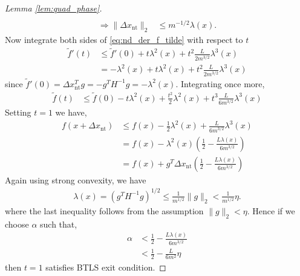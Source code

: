 \documentclass[12pt]{report}
\begin{document}
\begin{proof}[Lemma \ref{lem:quad_phase}]
\begin{align*}
\\ \Rightarrow   \|\Delta x_{\mathrm{nt}} \|_2  & \le m^{-1/2} \lambda(x).
\end{align*}
Now integrate both sides of \eqref{eq:nd_der_f_tilde} with respect to $t$
\begin{align*}
\tilde{f}'(t) & \le \tilde{f}'(0) + t \lambda^2(x) + t^2 \frac{L}{2m^{3/2}} \lambda^3(x)
\\ & = - \lambda^2(x) + t \lambda^2(x) + t^2 \frac{L}{2m^{3/2}} \lambda^3(x)
\end{align*} 
since $\tilde{f}'(0) = \Delta x_{\mathrm{nt}}^T g = -g^TH^{-1}g=- \lambda^2(x) $. Integrating once more,
\begin{align*}
\tilde{f}(t) & \le \tilde{f}(0)- t \lambda^2(x) + \frac{t^2}{2} \lambda^2(x) + t^3 \frac{L}{6 m^{3/2}} \lambda^3(x)
\end{align*} 
Setting $t=1$ we have,
\begin{align*}
f(x+\Delta x_{\mathrm{nt}}) & \le f(x) - \frac{1}{2} \lambda^2(x) + \frac{L}{6 m^{3/2}} \lambda^3(x)
\\ & = f(x) - \lambda^2(x) \left(\frac{1}{2}  - \frac{L\lambda(x)}{6 m^{3/2}} \right )
\\ & = f(x) + g^T \Delta x_{\mathrm{nt}} \left(\frac{1}{2}  - \frac{L\lambda(x)}{6 m^{3/2}} \right )
\end{align*} 
Again using strong convexity, we have
\begin{align*}
\lambda(x) = (g^T H^{-1} g )^{1/2} \le \frac{1}{m^{1/2}} \|g\|_2 < \frac{1}{m^{1/2}} \eta. 
\end{align*}
where the last inequality follows from the assumption $\|g\|_2 < \eta $. Hence if we choose $\alpha$ such that,
\begin{align*}
\alpha & < \frac{1}{2}  - \frac{L\lambda(x)}{6 m^{3/2}} %
\\ & < \frac{1}{2}  - \frac{L}{6 m^{2}}  \eta
\end{align*}
then $t=1$ satisfies BTLS exit condition.

\end{proof}
\end{document}
